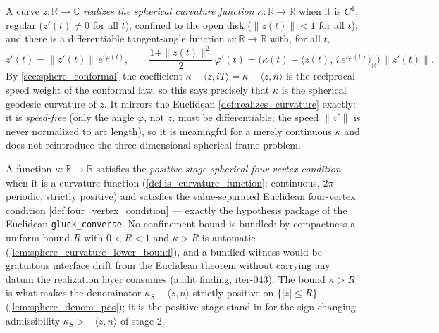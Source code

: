 \begin{definition}
  \label{def:realizes_spherical_curvature}
  A curve $z:\mathbb R\to\mathbb C$ \emph{realizes the spherical curvature function}
  $\kappa:\mathbb R\to\mathbb R$ when it is $C^1$, regular ($z'(t)\neq 0$ for all $t$),
  confined to the open disk ($\|z(t)\|<1$ for all $t$), and there is a differentiable
  tangent-angle function $\varphi:\mathbb R\to\mathbb R$ with, for all $t$,
  \[
    z'(t)=\|z'(t)\|\,e^{i\varphi(t)},\qquad
    \frac{1+\|z(t)\|^2}{2}\,\varphi'(t)
      =\bigl(\kappa(t)-\langle z(t),\,i\,e^{i\varphi(t)}\rangle_{\mathbb R}\bigr)\,\|z'(t)\| .
  \]
  By \cref{sec:sphere_conformal} the coefficient $\kappa-\langle z,iT\rangle
  =\kappa+\langle z,n\rangle$ is the reciprocal-speed weight of the conformal law, so this
  says precisely that $\kappa$ is the spherical geodesic curvature of $z$. It mirrors the
  Euclidean \cref{def:realizes_curvature} exactly: it is \emph{speed-free} (only the angle
  $\varphi$, not $z$, must be differentiable; the speed $\|z'\|$ is never normalized to arc
  length), so it is meaningful for a merely continuous $\kappa$ and does not reintroduce
  the three-dimensional spherical frame problem.
\end{definition}

\begin{definition}
  \label{def:sphere_four_vertex}
  A function $\kappa:\mathbb R\to\mathbb R$ satisfies the \emph{positive-stage spherical
  four-vertex condition} when it is a curvature function (\cref{def:is_curvature_function}:
  continuous, $2\pi$-periodic, strictly positive) and satisfies the value-separated Euclidean
  four-vertex condition \cref{def:four_vertex_condition} — exactly the hypothesis package of
  the Euclidean \texttt{gluck\_converse}. No confinement bound is bundled: by compactness a
  uniform bound $R$ with $0<R<1$ and $\kappa>R$ is automatic
  (\cref{lem:sphere_curvature_lower_bound}), and a bundled witness would be gratuitous
  interface drift from the Euclidean theorem without carrying any datum the realization
  layer consumes (audit finding, iter-043). The bound $\kappa>R$ is what makes the
  denominator $\kappa_S+\langle z,n\rangle$ strictly positive on $\{|z|\le R\}$
  (\cref{lem:sphere_denom_pos}); it is the positive-stage stand-in for the sign-changing
  admissibility $\kappa_S>-\langle z,n\rangle$ of stage 2.
\end{definition}

